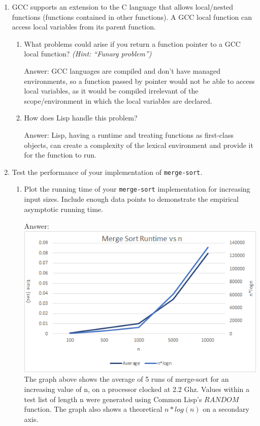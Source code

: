 \documentclass[12pt,letterpaper]{ntdhw}
\begin{document}
\begin{enumerate}
  \item GCC supports an extension to the C language that allows
  local/nested functions (functions contained in other functions).  A
  GCC local function can access local variables from its parent
  function.
  \begin{enumerate}
    \item What problems could arise if you return a function pointer
    to a GCC local function? \emph{(Hint: ``Funarg problem'')}

    \begin{emph}
      Answer: %
      GCC languages are compiled and don't have managed environments, so a function passed by pointer
      would not be able to access local variables, as it would be compiled irrelevant of the
      scope/environment in which the local variables are declared. 

    \end{emph}

    \item How does Lisp handle this problem?

    \begin{emph}
      Answer: Lisp, having a runtime and treating functions as first-class objects, can create
      a complexity of the lexical environment and provide it for the function to run.
    \end{emph}

  \end{enumerate}


  \item Test the performance of your implementation of
    \texttt{merge-sort}.
    \begin{enumerate}
    \item Plot the running time of your \texttt{merge-sort}
      implementation for increasing input sizes.  Include enough data
      points to demonstrate the empirical asymptotic running time.

    \begin{emph}
      Answer: %
      \break \includegraphics{merge} \break
      The graph above shows the average of 5 runs of merge-sort for an increasing value of n,
      on a processor clocked at 2.2 Ghz. Values within a test list of length n were generated using
      Common Lisp's \(RANDOM\) function. The graph also shows a theoretical \(n*log(n)\) on a secondary axis.
      

\end{emph}
\end{enumerate}
\end{enumerate}
\end{document}
